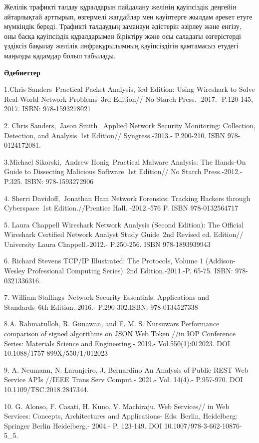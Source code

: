 Желілік трафикті талдау құралдарын пайдалану желінің қауіпсіздік
деңгейін айтарлықтай арттырып, өзгермелі жағдайлар мен қауіптерге жылдам
әрекет етуге мүмкіндік береді. Трафикті талдаудың заманауи әдістерін
әзірлеу және енгізу, оны басқа қауіпсіздік құралдарымен біріктіру және
осы саладағы өзгерістерді үздіксіз бақылау желілік инфрақұрылымның
қауіпсіздігін қамтамасыз етудегі маңызды қадамдар болып табылады.

\textbf{Әдебиеттер}

1.Chris Sanders~Practical Packet Analysis, 3rd Edition: Using Wireshark
to Solve Real-World Network Problems~3rd Edition// No Starch Press.
-2017.- P.120-145, 2017. ISBN: 978-1593278021

2. Chris Sanders,~Jason Smith~ Applied Network Security Monitoring:
Collection, Detection, and Analysis~1st Edition// Syngress.-2013.-
P.200-210. ISBN 978-0124172081.

3.Michael Sikorski,~Andrew Honig~Practical Malware Analysis: The
Hands-On Guide to Dissecting Malicious Software~1st Edition// No Starch
Press.-2012.-P.325. ISBN: 978-1593272906

4. Sherri Davidoff,~Jonathan Ham Network Forensics: Tracking Hackers
through Cyberspace~1st Edition.//Prentice Hall. -2012.-576 P. ISBN
978-0132564717

5. Laura Chappell Wireshark Network Analysis (Second Edition): The
Official Wireshark Certified Network Analyst Study Guide~2nd Revised ed.
Edition// University Laura Chappell.-2012.- P.250-256. ISBN
978-1893939943

6. Richard Stevens TCP/IP Illustrated: The Protocols, Volume 1
(Addison-Wesley Professional Computing Series)~2nd Edition.-2011.-P.
65-75. ISBN: 978-0321336316.

7. William Stallings~Network Security Essentials: Applications and
Standards~6th Edition.-2016.- P.290-302.ISBN: 978-0134527338

8.A. Rahmatulloh, R. Gunawan, and F. M. S. Nursuwars Performance
comparison of signed algorithms on JSON Web Token //in IOP Conference
Series: Materials Science and Engineering.- 2019.- Vol.550(1):012023.
DOI 10.1088/1757-899X/550/1/012023

9. A. Neumann, N. Laranjeiro, J. Bernardino An Analysis of Public REST
Web Service APIs //IEEE Trans Serv Comput.- 2021.- Vol. 14(4).-
P.957-970. DOI 10.1109/TSC.2018.2847344.

10. G. Alonso, F. Casati, H. Kuno, V. Machiraju. Web Services// in Web
Services: Concepts, Architectures and Applications- Eds. Berlin,
Heidelberg: Springer Berlin Heidelberg.- 2004.- P. 123-149. DOI
10.1007/978-3-662-10876-5\_5.

